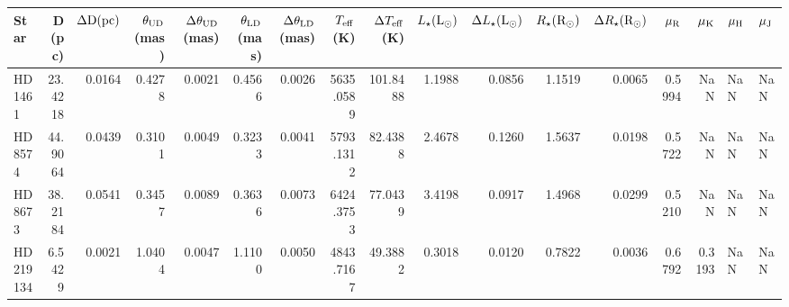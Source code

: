 \begin{tabular}{lrrrrrrrrrrrrrrll}
\toprule
Star & D (pc) & $\Delta \rm D (pc)$ & $\theta_{\rm UD}$ (mas) & $\Delta\theta_{\rm UD}$ (mas) & $\theta_{\rm LD}$ (mas) & $\Delta\theta_{\rm LD}$ (mas) & $T_{\rm eff}$ (K) & $\Delta T_{\rm eff}$ (K) & $L_{\star} (\rm L_{\odot})$ & $\Delta L_{\star} (\rm L_{\odot})$ & $R_{\star} (\rm R_{\odot})$ & $\Delta R_{\star} (\rm R_{\odot})$ & $\mu_{\rm R}$ & $\mu_{\rm K}$ & $\mu_{\rm H}$ & $\mu_{\rm J}$ \\
\midrule
HD 1461 & 23.4218 & 0.0164 & 0.4278 & 0.0021 & 0.4566 & 0.0026 & 5635.0589 & 101.8488 & 1.1988 & 0.0856 & 1.1519 & 0.0065 & 0.5994 & NaN & NaN & NaN \\
HD 8574 & 44.9064 & 0.0439 & 0.3101 & 0.0049 & 0.3233 & 0.0041 & 5793.1312 & 82.4388 & 2.4678 & 0.1260 & 1.5637 & 0.0198 & 0.5722 & NaN & NaN & NaN \\
HD 8673 & 38.2184 & 0.0541 & 0.3457 & 0.0089 & 0.3636 & 0.0073 & 6424.3753 & 77.0439 & 3.4198 & 0.0917 & 1.4968 & 0.0299 & 0.5210 & NaN & NaN & NaN \\
HD 219134 & 6.5429 & 0.0021 & 1.0404 & 0.0047 & 1.1100 & 0.0050 & 4843.7167 & 49.3882 & 0.3018 & 0.0120 & 0.7822 & 0.0036 & 0.6792 & 0.3193 & NaN & NaN \\
\bottomrule
\end{tabular}
